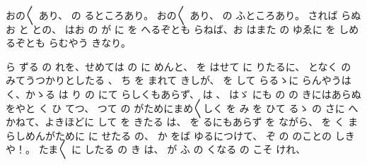 
おの〳〵
あり、
の
るところあり。
おの〳〵
あり、
の
ふところあり。
されば
らぬお
と
との、
はお
の
が
に
を
へるぞとも
らねば、お
はまた
の
ゆゑに
を
しめるぞとも
らむやう
きなり。

ら
ずる
の
れを、せめては
の
に
めんと、
を
はせて
に
りたるに、
となく
の
みてうつかりとしたる
、
ち
を
まれて
きしが、
を
して
らるゝに
らんやうは
く、かゝる
は
り
の
にて
らしくもあらず、
は
、
はゞ
にも
の
の
きにはあらぬをやと
く
ひ
てつ、
つて
の
がためにまめ〳〵しく
を
み
を
ひて
るゝ
の
さに
へかねて、よきほどに
して
を
きたる
は、
を
るにもあらず
を
ながら、
を
く
まらしめんがために
に
せたる
の、
か
をば
ゆるにつけて、
ぞ
の
のことの
しきや！。
たま〳〵
に
したる
の
き
は、
が
ふ
の
くなる
の
こそ
けれ、
